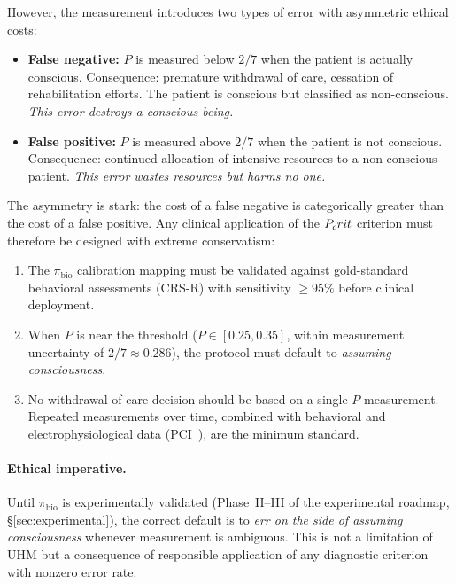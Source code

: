 However, the measurement introduces two types of error with asymmetric ethical costs:

\begin{itemize}[leftmargin=2em]
  \item \textbf{False negative:} $P$ is measured below $2/7$ when the patient is
        actually conscious.  Consequence: premature withdrawal of care, cessation of
        rehabilitation efforts.  The patient is conscious but classified as non-conscious.
        \emph{This error destroys a conscious being.}
  \item \textbf{False positive:} $P$ is measured above $2/7$ when the patient is
        not conscious.  Consequence: continued allocation of intensive resources to
        a non-conscious patient.  \emph{This error wastes resources but harms no one.}
\end{itemize}

The asymmetry is stark: the cost of a false negative is categorically greater than the
cost of a false positive.  Any clinical application of the $P_crit$ criterion must
therefore be designed with extreme conservatism:

\begin{enumerate}[leftmargin=2em]
  \item The $\pi_{\mathrm{bio}}$ calibration mapping must be validated against gold-standard
        behavioral assessments (CRS-R) with sensitivity $\geq 95\%$ before clinical
        deployment.
  \item When $P$ is near the threshold ($P \in [0.25, 0.35]$, within measurement
        uncertainty of $2/7 \approx 0.286$), the protocol must default to
        \emph{assuming consciousness}.
  \item No withdrawal-of-care decision should be based on a single $P$ measurement.
        Repeated measurements over time, combined with behavioral and
        electrophysiological data (PCI~\cite{casali2013}), are the minimum standard.
\end{enumerate}

\paragraph{Ethical imperative.}
Until $\pi_{\mathrm{bio}}$ is experimentally validated (Phase~II--III of the
experimental roadmap, \S\ref{sec:experimental}), the correct default is to
\emph{err on the side of assuming consciousness} whenever measurement is
ambiguous.  This is not a limitation of UHM but a consequence of responsible
application of any diagnostic criterion with nonzero error rate.

